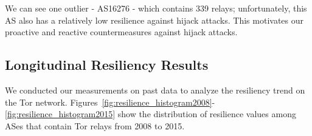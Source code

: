 We can see one outlier - AS16276 - which contains 339 relays; unfortunately, this AS also has a relatively low resilience against hijack attacks.  This motivates our proactive and reactive countermeasures against hijack attacks.

\subsection{Longitudinal Resiliency Results}

We conducted our measurements on past data to analyze the resiliency trend on the Tor network.  Figures~\ref{fig:resilience_histogram2008}-\ref{fig:resilience_histogram2015} show the distribution of resilience values among ASes that contain Tor relays from 2008 to 2015.

